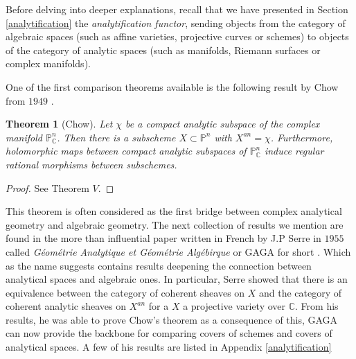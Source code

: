 \documentclass{article}
\theoremstyle{plain}
\newtheorem{theorem}{Theorem}[subsection]
\theoremstyle{definition}
\begin{document}
\noindent Before delving into deeper explanations, recall that we have presented in Section \ref{analytification} the \textit{analytification functor}, sending objects from 
the category of algebraic spaces (such as affine varieties, projective curves or schemes) to  objects of the category of analytic spaces (such as manifolds, Riemann surfaces or complex manifolds).




\noindent One of the first comparison theorems available is the following result by Chow from $1949$ \cite{Chow}.
\begin{theorem}[Chow]
    Let $\chi$ be a compact analytic subspace of the complex manifold $\mathbb{P}^n_{\mathbb{C}}$. 
    Then there is a subscheme $X\subset \mathbb{P}^n$ with $X^{an} = \chi$.
    Furthermore, holomorphic maps between compact analytic subspaces of $\mathbb{P}^n_{\mathbb{C}}$ induce regular rational morphisms between subschemes.
\end{theorem}
\begin{proof}
    See \cite{Chow} Theorem $V$.
\end{proof}

\noindent This theorem is often considered as the first bridge between complex analytical geometry and algebraic geometry. 
The next collection of results we mention are found in the more than influential paper written in French by J.P Serre in $1955$ called \textit{G\'eom\'etrie Analytique et G\'eom\'etrie Alg\'ebirque} or GAGA for short \cite{Serre}.
Which as the name suggests contains results deepening the connection between analytical spaces and algebraic ones. 
In particular, Serre showed that there is an equivalence between the category of coherent sheaves on $X$ and the category of coherent analytic sheaves on $X^{an}$ for a $X$ a projective variety over $\mathbb{C}$. 
From his results, he was able to prove Chow's theorem as a consequence of this, GAGA can now provide the backbone for comparing covers of schemes and covers of analytical spaces. A few of his results are listed in Appendix \ref{analytification}\\
\end{document}
